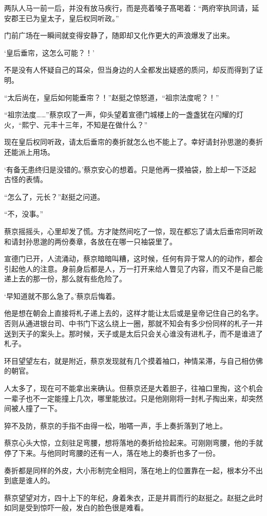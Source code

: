 两队人马一前一后，并没有放马疾行，而是亮着嗓子髙喝着：“两府宰执同请，延安郡王已为皇太子，皇后权同听政。”

门前广场在一瞬间就变得安静了，随即却又化作更大的声浪爆发了出来。

‘皇后垂帘，这怎么可能？！’

不是没有人怀疑自己的耳朵，但当身边的人全都发出疑惑的质问，却反而得到了证明。

“太后尚在，皇后如何能垂帘？！”赵挺之惊怒道，“祖宗法度呢？！”

“祖宗法度……”蔡京叹了一声，仰头望着宣德门城楼上的一盏盏犹在闪耀的灯火，“熙宁、元丰十三年，不知是在做什么？”

现在皇后权同听政，请太后垂帘的奏折就怎么也不能上了。幸好请封孙思邈的奏折还能派上用场。

‘有备无患终归是没错的。’蔡京安心的想着。只是他再一摸袖袋，脸上却一下泛起古怪的表情。

“怎么了，元长？”赵挺之问道。

“不，没事。”

蔡京摇摇头，心里却发了慌。方才陡然间吃了一惊，现在都忘了请太后垂帘同听政和请封孙思邈的两份奏章，各放在在哪一只袖袋里了。

宣德门已开，人流涌动，蔡京暗暗叫糟，这时候，任何有异于常人的的动作，都会引起他人的注意。身前身后都是人，万一打开来给人瞥见了内容，而又不是自己能递上去的那一份，那么就有些危险了。

‘早知道就不那么急了。’蔡京后悔着。

他是想在朝会上直接将札子递上去的，这样才能让太后或是皇帝记住自己的名字。否则从通进银台司、中书门下这么绕上一圈，那就不知会有多少份同样的札子一并送到天子的案头上。那时候，天子或是太后只会关心谁没有进札子，而不是谁进了札子。

环目望望左右，就是附近，蔡京发现就有几个摸着袖口，神情呆滞，与自己相仿佛的朝官。

人太多了，现在可不能拿出来确认。但蔡京还是大着胆子，往袖口里掏，这个机会一辈子也不一定能撞上几次，哪里能放过。只是他刚刚将一封札子掏出来，却突然间被人撞了一下。

猝不及防，蔡京的手指不由得一松，啪嗒一声，手上奏折落到了地上。

蔡京心头大惊，立刻驻足弯腰，想将落地的奏折给捡起来。可刚刚弯腰，他的手就停了下来。与他同时弯腰的还有一人，落在地上的奏折也多了一份。

奏折都是同样的外皮，大小形制完全相同，落在地上的位置靠在一起，根本分不出到底是谁人的。

蔡京望望对方，四十上下的年纪，身着朱衣，正是并肩而行的赵挺之。赵挺之此时如同是受到惊吓一般，发白的脸色很是难看。

